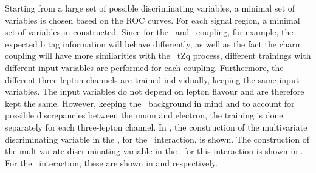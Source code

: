 Starting from a large set of possible discriminating variables, a minimal set of variables is chosen based on the ROC curves. For each signal region, a minimal set of variables in constructed. Since for the \Zut\ and \Zct\ coupling, for example, the expected b tag information will behave differently, as well as the fact the charm coupling will have more similarities with the \SM\ tZq process, different trainings with different input variables are performed for each coupling. Furthermore, the different three-lepton channels are trained individually, keeping the same input variables. The input variables do not depend on lepton flavour and are therefore kept the same. However, keeping the \NPL\ background in mind and to account for possible discrepancies between the muon and electron, the training is done separately for each three-lepton channel. In , the construction of the multivariate discriminating variable in the \STSR, for the \Zut\ interaction, is shown. The construction of the multivariate discriminating variable in the \TTSR\ for this interaction is shown in . For the \Zct\ interaction, these are shown in  and  respectively. 

